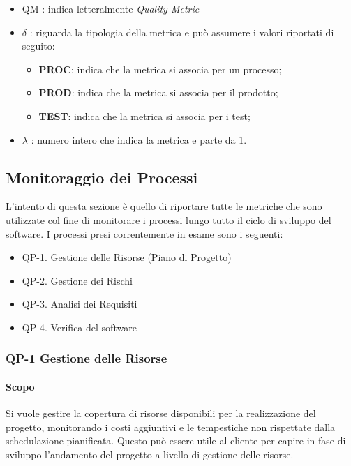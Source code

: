 \begin{itemize}
	\item QM : indica letteralmente \textit{Quality Metric}
	\item \(\delta\) : riguarda la tipologia della metrica e può assumere i valori riportati di seguito:
		\begin{itemize}
			\item \textbf{PROC}: indica che la metrica si associa per un processo;
			\item \textbf{PROD}: indica che la metrica si associa per il prodotto;
			\item \textbf{TEST}: indica che la metrica si associa per i test;
		\end{itemize}
	\item \(\lambda\) : numero intero che indica la metrica e parte da 1.
\end{itemize}

\subsection{Monitoraggio dei Processi}

L'intento di questa sezione è quello di riportare tutte le metriche che sono utilizzate col fine di monitorare i processi lungo tutto il ciclo di sviluppo del software. I processi presi correntemente in esame sono i seguenti:

\begin{itemize}
	\item QP-1. Gestione delle Risorse (Piano di Progetto)
	\item QP-2. Gestione dei Rischi
	\item QP-3. Analisi dei Requisiti
	\item QP-4. Verifica del software
\end{itemize}

	\subsubsection{QP-1 Gestione delle Risorse}

		\paragraph{Scopo}

		Si vuole gestire la copertura di risorse disponibili per la realizzazione del progetto, monitorando i costi aggiuntivi e le tempestiche non rispettate dalla schedulazione pianificata. Questo può essere utile al cliente per capire in fase di sviluppo l'andamento del progetto a livello di gestione delle risorse.

